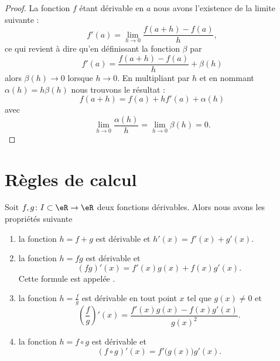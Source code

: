 \begin{proof}
    La fonction \( f\) étant dérivable en \( a\) nous avons l'existence de la limite suivante :
    \begin{equation}
        f'(a)=\lim_{h\to 0} \frac{ f(a+h)-f(a) }{ h },
    \end{equation}
    ce qui revient à dire qu'en définissant la fonction \( \beta\) par
    \begin{equation}
        f'(a)=\frac{ f(a+h)-f(a) }{ h }+\beta(h)
    \end{equation}
    alors \( \beta(h)\to 0\) lorsque \( h\to 0\). En multipliant par \( h\) et en nommant \( \alpha(h)=h\beta(h)\) nous trouvons le résultat :
    \begin{equation}
        f(a+h)=f(a)+hf'(a)+\alpha(h)
    \end{equation}
    avec
    \begin{equation}
        \lim_{h\to 0} \frac{ \alpha(h) }{ h }=\lim_{h\to 0} \beta(h)=0.
    \end{equation}
\end{proof}

\section{Règles de calcul}

\begin{proposition}     \label{PROPooOUZOooEcYKxn}
    Soit $f,g\colon I\subset\eR\to\eR $ deux fonctions dérivables. Alors nous avons les propriétés suivante
    \begin{enumerate}
    	\item
    		la fonction $h=f+g$ est dérivable et $h'(x)=f'(x)+g'(x)$.
    	\item
    		la fonction $h=fg$ est dérivable et
    		\begin{equation}
    			(fg)'(x)=f'(x)g(x)+f(x)g'(x).
    		\end{equation}
    		Cette formule est appelée .
        \item       \label{ITEMooMUNQooLiKffz}
    		la fonction $h=\frac{ f }{ g }$ est dérivable en tout point $x$ tel que $g(x)\neq 0$ et
    		\begin{equation}
    			\left( \frac{ f }{ g } \right)'(x)=\frac{ f'(x)g(x)-f(x)g'(x) }{ g(x)^2 }.
    		\end{equation}
        \item   \label{ITEMooLYZCooVUPTyh}
    		la fonction $h=f\circ g$ est dérivable et
    		    \begin{equation}
    		    	(f\circ g)'(x)=f'\big( g(x) \big)g'(x).
    	    	\end{equation}
    \end{enumerate}
\end{proposition}

